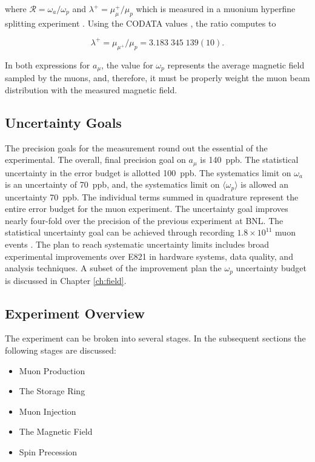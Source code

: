 where $\mathcal{R} = \omega_a / \omega_p$ and $\lambda^+ = \mu_\mu^+ / \mu_p$  which is measured in a muonium hyperfine splitting experiment \cite{muonium-hyperfine}.  Using the CODATA values \cite{codata}, the ratio computes to

\begin{equation}
\label{eqn:muon-to-proton-mu-ratio}
\lambda^+ = \mu_{\mu^+} / \mu_p = 3.183\;345\;139(10).
\end{equation}

In both expressions for $a_\mu$, the value for $\omega_p$ represents the average magnetic field sampled by the muons, and, therefore, it must be properly weight the muon beam distribution with the measured magnetic field.

\subsection{Uncertainty Goals}

The precision goals for the measurement round out the essential of the experimental.  The overall, final precision goal on $a_\mu$ is \SI{140}{ppb}.  The statistical uncertainty in the error budget is allotted \SI{100}{ppb}.  The systematics limit on $\omega_a$ is an uncertainty of \SI{70}{ppb}, and, the systematics limit on $\langle \omega_p \rangle$ is allowed an uncertainty \SI{70}{ppb}.  The individual terms summed in quadrature represent the entire error budget for the muon \gmtwo experiment.  The uncertainty goal improves nearly four-fold over the precision of the previous experiment at BNL.  The statistical uncertainty goal can be achieved through recording $1.8\times10^{11}$ muon events \cite{e989-tdr}.  The plan to reach systematic uncertainty limits includes broad experimental improvements over E821 in hardware systems, data quality, and analysis techniques.  A subset of the improvement plan the $\omega_p$ uncertainty budget is discussed in Chapter \ref{ch:field}.

\subsection{Experiment Overview}

The \mugmtwo experiment can be broken into several stages.  In the subsequent sections the following stages are discussed:

\begin{itemize}[noitemsep]
\item{Muon Production}
\item{The Storage Ring}
\item{Muon Injection}
\item{The Magnetic Field}
\item{Spin Precession}
\end{itemize}

